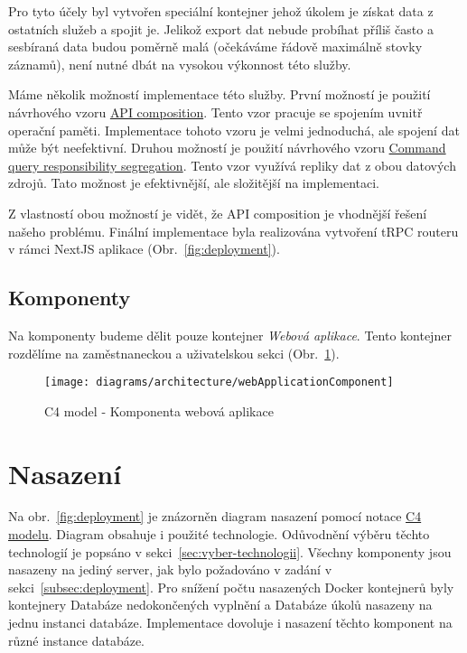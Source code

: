 Pro tyto účely byl vytvořen speciální kontejner jehož úkolem je získat data z ostatních služeb a spojit je.
Jelikož export dat nebude probíhat příliš často a sesbíraná data budou poměrně malá (očekáváme řádově maximálně stovky záznamů), není nutné dbát na vysokou výkonnost této služby.

Máme několik možností implementace této služby.
První možností je použití návrhového vzoru \href{https://microservices.io/patterns/data/api-composition.html}{API composition}.
Tento vzor pracuje se spojením uvnitř operační paměti.
Implementace tohoto vzoru je velmi jednoduchá, ale spojení dat může být neefektivní.
Druhou možností je použití návrhového vzoru \href{https://microservices.io/patterns/data/cqrs.html}{Command query responsibility segregation}.
Tento vzor využívá repliky dat z obou datových zdrojů.
Tato možnost je efektivnější, ale složitější na implementaci.

Z vlastností obou možností je vidět, že API composition je vhodnější řešení našeho problému.
Finální implementace byla realizována vytvoření tRPC routeru v rámci NextJS aplikace (Obr.~\ref{fig:deployment}).

\subsection{Komponenty}\label{subsec:komponenty}

Na komponenty budeme dělit pouze kontejner \textit{Webová aplikace}.
Tento kontejner rozdělíme na zaměstnaneckou a uživatelskou sekci (Obr.~\ref{fig:architecture-component-web-application}).

\begin{figure}[H]
    \centering
    \texttt{[image: diagrams/architecture/webApplicationComponent]}
    \caption{C4 model - Komponenta webová aplikace}\label{fig:architecture-component-web-application}
\end{figure}


\section{Nasazení}\label{sec:deployment}

Na obr.~\ref{fig:deployment} je znázorněn diagram nasazení pomocí notace \href{https://c4model.com/#DeploymentDiagram}{C4 modelu}.
Diagram obsahuje i použité technologie.
Odůvodnění výběru těchto technologií je popsáno v sekci~\ref{sec:vyber-technologii}.
Všechny komponenty jsou nasazeny na jediný server, jak bylo požadováno v zadání v sekci~\ref{subsec:deployment}.
Pro snížení počtu nasazených Docker kontejnerů byly kontejnery Databáze nedokončených vyplnění a Databáze úkolů nasazeny na jednu instanci databáze.
Implementace dovoluje i nasazení těchto komponent na různé instance databáze.

